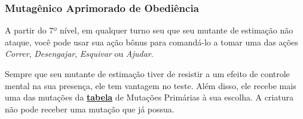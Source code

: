 \documentclass[letterpaper,twocolumn,openany]{dndbook}
\begin{document}
	\subsubsection{Mutagênico Aprimorado de Obediência}
	A partir do 7º nível, em qualquer turno seu que seu mutante de estimação não ataque, você pode usar sua ação bônus para comandá-lo a tomar uma das ações \textit{Correr}, \textit{Desengajar}, \textit{Esquivar} ou \textit{Ajudar}.
	\par Sempre que seu mutante de estimação tiver de resistir a um efeito de controle mental na sua presença, ele tem vantagem no teste. Além disso, ele recebe mais uma das mutações da \hyperref[tab:mutacoes_primarias]{\textbf{tabela}} de Mutações Primárias à sua escolha. A criatura não pode receber uma mutação que já possua.
	
	\onecolumn
\end{document}
